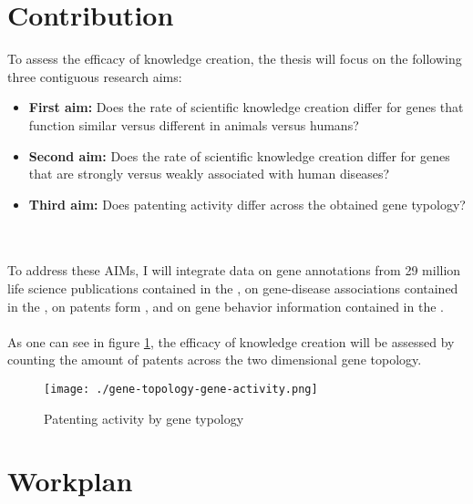 \documentclass{article}
\begin{document}
\section{Contribution}

To assess the efficacy of knowledge creation, the thesis will focus on the following three contiguous research aims:
\begin{itemize}
	\item \textbf{First aim:} Does the rate of scientific knowledge creation differ for genes that function similar versus different in animals versus humans?
	\item \textbf{Second aim:} Does the rate of scientific knowledge creation differ for genes that are strongly versus weakly associated with human diseases?
	\item \textbf{Third aim:} Does patenting activity differ across the obtained gene typology?
\end{itemize}
\\
\\
To address these AIMs, I will integrate data on gene annotations from 29 million life science publications contained in the , on gene-disease associations contained in the , on patents form , and on gene behavior information contained in the . \\
\\
As one can see in figure \ref{fig:gene-topology-gene-activity}, the efficacy of knowledge creation will be assessed by counting the amount of patents across the two dimensional gene topology.

\begin{figure}
	\begin{center}
	\texttt{[image: ./gene-topology-gene-activity.png]}
	\caption[Patenting activity by gene typology]{Patenting activity by gene typology}
	\label{fig:gene-topology-gene-activity}
	\end{center}
\end{figure}

\section{Workplan}
\end{document}
